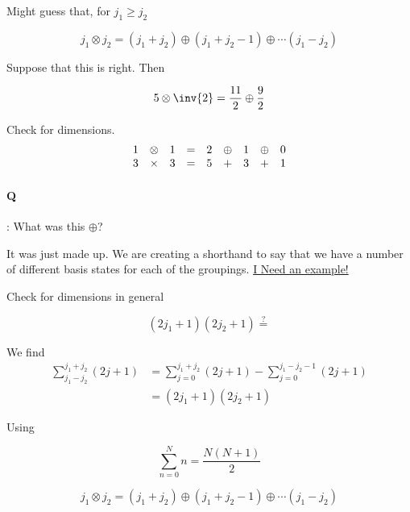 Might guess that, for $j_1 \ge j_2$

\begin{equation}\label{eqn:qmTwoL17:380}
j_1 \otimes j_2 = 
\left( j_1 + j_2 \right)
 \oplus 
\left( j_1 + j_2 - 1 \right)
 \oplus 
\cdots
\left( j_1 - j_2 \right)
\end{equation}

Suppose that this is right.  Then

\begin{equation}\label{eqn:qmTwoL17:400}
5 \otimes \inv{2} = \frac{11}{2} \oplus \frac{9}{2}
\end{equation}

Check for dimensions.
\begin{equation}\label{eqn:qmTwoL17:420}
\begin{array}{l l l l l l l l l}
1 &\otimes &1 &= &2 &\oplus &1 &\oplus &0 \\
3 & \times &3 &= &5 & +     &3 & +     &1
\end{array}
\end{equation}

\paragraph{Q}: What was this $\oplus$?

It was just made up.  We are creating a shorthand to say that we have a number of different basis states for each of the groupings.  \underline{I Need an example!}

Check for dimensions in general

\begin{equation}\label{eqn:qmTwoL17:440}
(2 j_1 + 1)(2 j_2 + 1) \stackrel{?}{=}
\end{equation}

We find
\begin{align*}
\sum_{j_1 - j_2}^{j_1 + j_2} (2 j+ 1) 
&= 
\sum_{j=0}^{j_1 + j_2} (2 j + 1) 
-
\sum_{j=0}^{j_1 - j_2 - 1} (2 j + 1) \\
&=
(2 j_1 + 1)(2 j_2 + 1) 
\end{align*}

Using 

\begin{equation}\label{eqn:qmTwoL17:460}
\sum_{n=0}^N n = \frac{N(N+1)}{2}
\end{equation}

\begin{equation}\label{eqn:qmTwoL17:480}
j_1 \otimes j_2
= 
(j_1 + j_2) \oplus
(j_1 + j_2 - 1) \oplus
\cdots
(j_1 - j_2) 
\end{equation}


